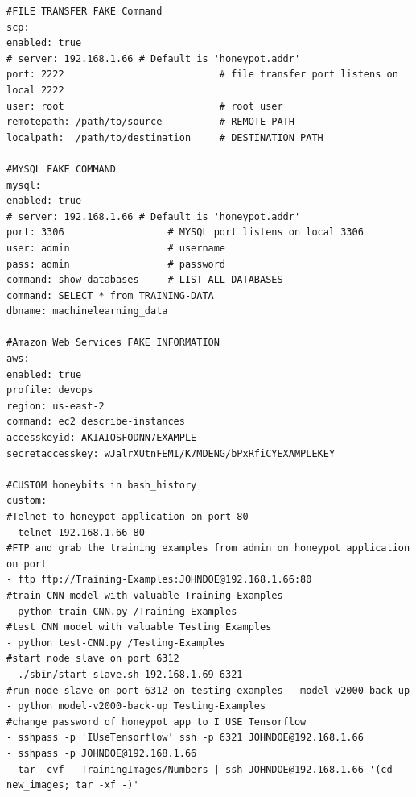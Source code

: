 \documentclass[grad,lot,lof,11pt,oneside,onehalfspace]{RUthesis}
\begin{document}
\begin{lstlisting}
#FILE TRANSFER FAKE Command
scp:
enabled: true
# server: 192.168.1.66 # Default is 'honeypot.addr'
port: 2222                           # file transfer port listens on local 2222
user: root                           # root user
remotepath: /path/to/source          # REMOTE PATH
localpath:  /path/to/destination     # DESTINATION PATH

#MYSQL FAKE COMMAND
mysql:
enabled: true
# server: 192.168.1.66 # Default is 'honeypot.addr'
port: 3306                  # MYSQL port listens on local 3306
user: admin                 # username
pass: admin                 # password
command: show databases     # LIST ALL DATABASES
command: SELECT * from TRAINING-DATA
dbname: machinelearning_data

#Amazon Web Services FAKE INFORMATION
aws:
enabled: true
profile: devops
region: us-east-2
command: ec2 describe-instances
accesskeyid: AKIAIOSFODNN7EXAMPLE
secretaccesskey: wJalrXUtnFEMI/K7MDENG/bPxRfiCYEXAMPLEKEY

#CUSTOM honeybits in bash_history
custom:
#Telnet to honeypot application on port 80
- telnet 192.168.1.66 80
#FTP and grab the training examples from admin on honeypot application on port
- ftp ftp://Training-Examples:JOHNDOE@192.168.1.66:80
#train CNN model with valuable Training Examples
- python train-CNN.py /Training-Examples
#test CNN model with valuable Testing Examples
- python test-CNN.py /Testing-Examples
#start node slave on port 6312
- ./sbin/start-slave.sh 192.168.1.69 6321
#run node slave on port 6312 on testing examples - model-v2000-back-up
- python model-v2000-back-up Testing-Examples
#change password of honeypot app to I USE Tensorflow
- sshpass -p 'IUseTensorflow' ssh -p 6321 JOHNDOE@192.168.1.66
- sshpass -p JOHNDOE@192.168.1.66
- tar -cvf - TrainingImages/Numbers | ssh JOHNDOE@192.168.1.66 '(cd new_images; tar -xf -)'
\end{lstlisting}
\end{document}
